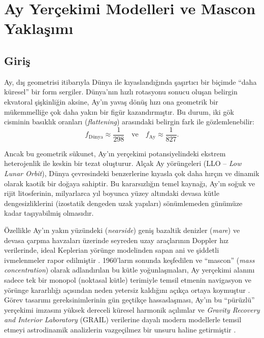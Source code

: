 \chapter{Ay Yerçekimi Modelleri ve Mascon Yaklaşımı}

\section{Giriş}
\label{sec:introduction}

Ay, dış geometrisi itibarıyla Dünya ile kıyaslandığında şaşırtıcı bir biçimde ``daha küresel'' bir form sergiler. Dünya'nın hızlı rotasyonu sonucu oluşan belirgin ekvatoral şişkinliğin aksine, Ay'ın yavaş dönüş hızı ona geometrik bir mükemmelliğe çok daha yakın bir figür kazandırmıştır. Bu durum, iki gök cisminin basıklık oranları (\textit{flattening}) arasındaki belirgin fark ile gözlemlenebilir:
\[
f_{\text{Dünya}} \approx \frac{1}{298}
\quad \text{ve} \quad
f_{\text{Ay}} \approx \frac{1}{827}.
\]

Ancak bu geometrik sükunet, Ay'ın yerçekimi potansiyelindeki ekstrem heterojenlik ile keskin bir tezat oluşturur. Alçak Ay yörüngeleri (LLO -- \textit{Low Lunar Orbit}), Dünya çevresindeki benzerlerine kıyasla çok daha hırçın ve dinamik olarak kaotik bir doğaya sahiptir. Bu kararsızlığın temel kaynağı, Ay'ın soğuk ve rijit litosferinin, milyarlarca yıl boyunca yüzey altındaki devasa kütle dengesizliklerini (izostatik dengeden uzak yapıları) sönümlemeden günümüze kadar taşıyabilmiş olmasıdır.

\bigskip
Özellikle Ay'ın yakın yüzündeki (\textit{nearside}) geniş bazaltik denizler (\textit{mare}) ve devasa çarpma havzaları üzerinde seyreden uzay araçlarının Doppler hız verilerinde, ideal Keplerian yörünge modelinden sapan ani ve şiddetli ivmelenmeler rapor edilmiştir \cite{Muller1968}. 1960'ların sonunda keşfedilen ve ``mascon'' (\textit{mass concentration}) olarak adlandırılan bu kütle yoğunlaşmaları, Ay yerçekimi alanını sadece tek bir monopol (noktasal kütle) terimiyle temsil etmenin navigasyon ve yörünge kararlılığı açısından neden yetersiz kaldığını açıkça ortaya koymuştur \cite{Konopliv2001}. Görev tasarımı gereksinimlerinin gün geçtikçe hassaslaşması, Ay'ın bu ``pürüzlü'' yerçekimi imzasını yüksek dereceli küresel harmonik açılımlar ve \textit{Gravity Recovery and Interior Laboratory} (GRAIL) verilerine dayalı modern modellerle temsil etmeyi astrodinamik analizlerin vazgeçilmez bir unsuru haline getirmiştir \cite{Zuber2013}.


